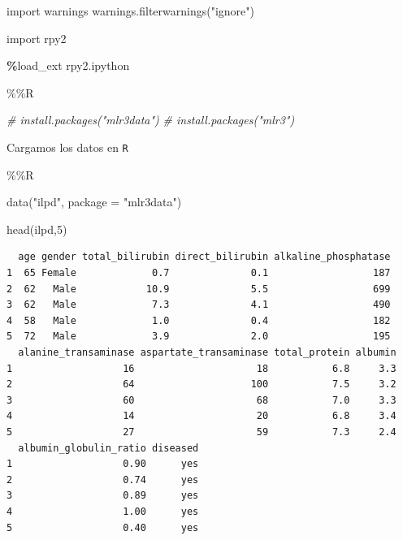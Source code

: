 \documentclass[
  11pt,
  a4paper,
]{article}
\newenvironment{Shaded}{\begin{snugshade}}{\end{snugshade}}
\newcommand{\AttributeTok}[1]{\textcolor[rgb]{0.77,0.63,0.00}{#1}}
\newcommand{\CommentTok}[1]{\textcolor[rgb]{0.56,0.35,0.01}{\textit{#1}}}
\newcommand{\DecValTok}[1]{\textcolor[rgb]{0.00,0.00,0.81}{#1}}
\newcommand{\FunctionTok}[1]{\textcolor[rgb]{0.00,0.00,0.00}{#1}}
\newcommand{\ImportTok}[1]{#1}
\newcommand{\NormalTok}[1]{#1}
\newcommand{\OperatorTok}[1]{\textcolor[rgb]{0.81,0.36,0.00}{\textbf{#1}}}
\newcommand{\SpecialCharTok}[1]{\textcolor[rgb]{0.00,0.00,0.00}{#1}}
\newcommand{\StringTok}[1]{\textcolor[rgb]{0.31,0.60,0.02}{#1}}
\begin{document}
\begin{Shaded}
\begin{Highlighting}[]
\ImportTok{import}\NormalTok{ warnings}
\NormalTok{warnings.filterwarnings(}\StringTok{"ignore"}\NormalTok{)}
\end{Highlighting}
\end{Shaded}

\begin{Shaded}
\begin{Highlighting}[]
\ImportTok{import}\NormalTok{ rpy2}

\OperatorTok{\%}\NormalTok{load\_ext rpy2.ipython}
\end{Highlighting}
\end{Shaded}

\begin{Shaded}
\begin{Highlighting}[]
\SpecialCharTok{\%\%}\NormalTok{R}

\CommentTok{\# install.packages("mlr3data")}
\CommentTok{\# install.packages("mlr3")}
\end{Highlighting}
\end{Shaded}

\newpage

Cargamos los datos en \texttt{R}

\begin{Shaded}
\begin{Highlighting}[]
\SpecialCharTok{\%\%}\NormalTok{R}

\FunctionTok{data}\NormalTok{(}\StringTok{"ilpd"}\NormalTok{, }\AttributeTok{package =} \StringTok{"mlr3data"}\NormalTok{)}

\FunctionTok{head}\NormalTok{(ilpd,}\DecValTok{5}\NormalTok{)}
\end{Highlighting}
\end{Shaded}

\begin{verbatim}
  age gender total_bilirubin direct_bilirubin alkaline_phosphatase
1  65 Female             0.7              0.1                  187
2  62   Male            10.9              5.5                  699
3  62   Male             7.3              4.1                  490
4  58   Male             1.0              0.4                  182
5  72   Male             3.9              2.0                  195
  alanine_transaminase aspartate_transaminase total_protein albumin
1                   16                     18           6.8     3.3
2                   64                    100           7.5     3.2
3                   60                     68           7.0     3.3
4                   14                     20           6.8     3.4
5                   27                     59           7.3     2.4
  albumin_globulin_ratio diseased
1                   0.90      yes
2                   0.74      yes
3                   0.89      yes
4                   1.00      yes
5                   0.40      yes
\end{verbatim}
\end{document}
